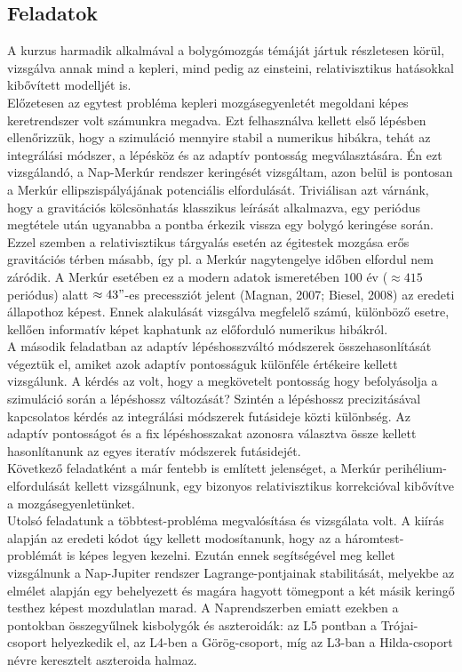 \begin{multicols}{2}

\section{Feladatok} \label{sec:1}
A kurzus harmadik alkalmával a bolygómozgás témáját jártuk részletesen körül, vizsgálva annak mind a kepleri, mind pedig az einsteini, relativisztikus hatásokkal kibővített modelljét is.\\
Előzetesen az egytest probléma kepleri mozgásegyenletét megoldani képes keretrendszer volt számunkra megadva. Ezt felhasználva kellett első lépésben ellenőrizzük, hogy a szimuláció mennyire stabil a numerikus hibákra, tehát az integrálási módszer, a lépésköz és az adaptív pontosság megválasztására. Én ezt vizsgálandó, a Nap-Merkúr rendszer keringését vizsgáltam, azon belül is pontosan a Merkúr ellipszispályájának potenciális elfordulását. Triviálisan azt várnánk, hogy a gravitációs kölcsönhatás klasszikus leírását alkalmazva, egy periódus megtétele után ugyanabba a pontba érkezik vissza egy bolygó keringése során. Ezzel szemben a relativisztikus tárgyalás esetén az égitestek mozgása erős gravitációs térben másabb, így pl. a Merkúr nagytengelye időben elfordul nem záródik. A Merkúr esetében ez a modern adatok ismeretében $100$ év ($\approx 415$ periódus) alatt $\approx 43"$-es precessziót jelent (Magnan, 2007\cite{2007arXiv0712.3709M}; Biesel, 2008\cite{biesel2008precession}) az eredeti állapothoz képest. Ennek alakulását vizsgálva megfelelő számú, különböző esetre, kellően informatív képet kaphatunk az előforduló numerikus hibákról. \\
A második feladatban az adaptív lépéshosszváltó módszerek összehasonlítását végeztük el, amiket azok adaptív pontosságuk különféle értékeire kellett vizsgálunk. A kérdés az volt, hogy a megkövetelt pontosság hogy befolyásolja a szimuláció során a lépéshossz változását? Szintén a lépéshossz precizitásával kapcsolatos kérdés az integrálási módszerek futásideje közti különbség. Az adaptív pontosságot és a fix lépéshosszakat azonosra választva össze kellett hasonlítanunk az egyes iteratív módszerek futásidejét. \\
Következő feladatként a már fentebb is említett jelenséget, a Merkúr perihélium-elfordulását kellett vizsgálnunk, egy bizonyos relativisztikus korrekcióval kibővítve a mozgásegyenletünket. \\
Utolsó feladatunk a többtest-probléma megvalósítása és vizsgálata volt. A kiírás alapján az eredeti kódot úgy kellett modosítanunk, hogy az a háromtest-problémát is képes legyen kezelni. Ezután ennek segítségével meg kellet vizsgálnunk a Nap-Jupiter rendszer Lagrange-pontjainak stabilitását, melyekbe az elmélet alapján egy behelyezett és magára hagyott tömegpont a két másik keringő testhez képest mozdulatlan marad. A Naprendszerben emiatt ezekben a pontokban összegyűlnek kisbolygók és aszteroidák: az L5 pontban a Trójai-csoport helyezkedik el, az L4-ben a Görög-csoport, míg az L3-ban a Hilda-csoport névre keresztelt aszteroida halmaz.


\end{multicols}
